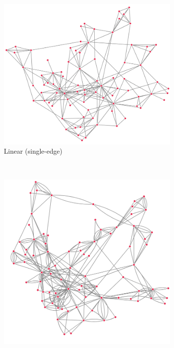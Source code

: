 \begin{figure}[H]
     \centering
      \begin{subfigure}[b]{.32\textheight}
         \centering
     \includegraphics[width=\textwidth]{figures_c1/edgetype/linearsingle.png} \caption{Linear (single-edge)}
     \end{subfigure}\\
    \begin{subfigure}[b]{.32\textheight}
         \centering
     \includegraphics[width=\textwidth]{figures_c1/edgetype/multiquadraticgray.png}

\end{subfigure}
\end{figure}
